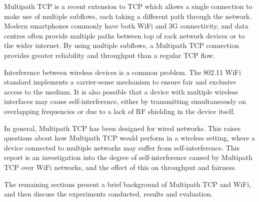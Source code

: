 Multipath TCP is a recent extension to TCP which allows a single connection to
make use of multiple subflows, each taking a different path through the network.
Modern smartphones commonly  have both WiFi and 3G connectivity, and data
centres often provide multiple paths between top of rack network devices or to
the wider internet. By using multiple subflows, a Multipath TCP connection
provides greater reliability and throughput than a regular TCP flow.

Interference between wireless devices is a common problem. The 802.11 WiFi
standard implements a carrier-sense mechanism to ensure fair and exclusive
access to the medium. It is also possible that a device with multiple wireless
interfaces may cause self-interference, either by transmitting simultaneously on
overlapping frequencies or due to a lack of RF shielding in the device itself.

In general, Multipath TCP has been designed for wired networks. This raises
questions about how Multipath TCP would perform in a wireless setting, where a
device connected to multiple networks may suffer from self-interference. This
report is an investigation into the degree of self-interference caused by
Multipath TCP over WiFi networks, and the effect of this on throughput and
fairness.

The remaining sections present a brief background of Multipath TCP and WiFi, and
then discuss the experiments conducted, results and evaluation.
